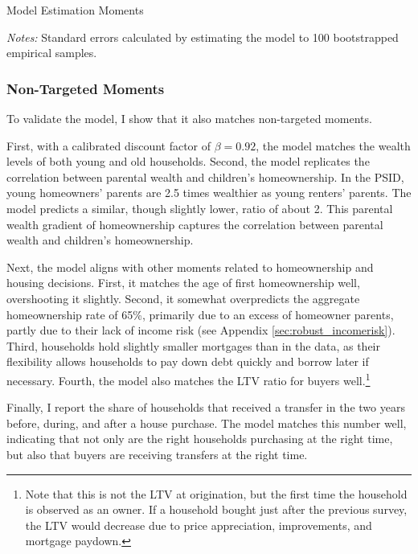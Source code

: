 \documentclass[12pt]{article}
\begin{document}
\begin{table}
	\center 
	\begin{threeparttable}
	\caption{Model Estimation Moments}\label{tab:esttable}
		
	
		\begin{tablenotes}
			\footnotesize
			\textit{Notes:} Standard errors calculated by estimating the model to 100 bootstrapped empirical samples.
		\end{tablenotes}
	\end{threeparttable}
\end{table}


\subsubsection{Non-Targeted Moments}\label{sec:externalval}
To validate the model, I show that it also matches non-targeted moments. 

First, with a calibrated discount factor of $\beta=0.92$, the model matches the wealth levels of both young and old households. Second,  the model replicates the correlation between parental wealth and children's homeownership. In the PSID, young homeowners' parents are 2.5 times wealthier as young renters' parents. The model predicts a similar, though slightly lower, ratio of about 2. This parental wealth gradient of homeownership captures the correlation between parental wealth and children's homeownership. 

Next, the model aligns with other moments related to homeownership and housing decisions. First, it matches the age of first homeownership well, overshooting it slightly. Second, it somewhat overpredicts the aggregate homeownership rate of 65\%, primarily due to an excess of homeowner parents,  partly due to their lack of income risk (see Appendix \ref{sec:robust_incomerisk}). Third, households hold slightly smaller mortgages than in the data, as their flexibility allows households to pay down debt quickly and borrow later if necessary. Fourth, the model also matches the LTV ratio for buyers well.\footnote{Note that this is not the LTV at origination, but the first time the household is observed as an owner. If a household bought just after the previous survey, the LTV would decrease due to price appreciation, improvements, and mortgage paydown.}

Finally, I report the share of households that received a transfer in the two years before, during, and after a house purchase. The model matches this number well, indicating that not only are the right households purchasing at the right time, but also that buyers are receiving transfers at the right time.
\end{document}
